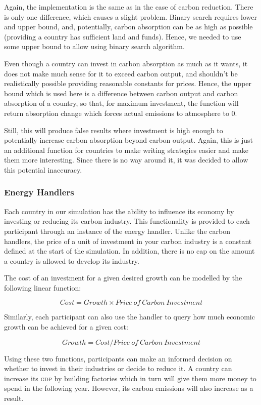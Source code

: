 Again, the implementation is the same as in the case of carbon reduction. There is only one difference, which causes a slight problem. Binary search requires lower and upper bound, and, potentially, carbon absorption can be as high as possible (providing a country has sufficient land and funds). Hence, we needed to use some upper bound to allow using binary search algorithm.

Even though a country can invest in carbon absorption as much as it wants, it does not make much sense for it to exceed carbon output, and shouldn't be realistically possible providing reasonable constants for prices. Hence, the upper bound which is used here is a difference between carbon output and carbon absorption of a country, so that, for maximum investment, the function will return absorption change which forces actual emissions to atmosphere to 0.

Still, this will produce false results where investment is high enough to potentially increase carbon absorption beyond carbon output. Again, this is just an additional function for countries to make writing strategies easier and make them more interesting. Since there is no way around it, it was decided to allow this potential inaccuracy.

\subsubsection{Energy Handlers}

Each country in our simulation has the ability to influence its economy by investing or reducing its carbon industry. This functionality is provided to each participant through an instance of the energy handler. Unlike the carbon handlers, the price of a unit of investment in your carbon industry is a constant defined at the start of the simulation. In addition, there is no cap on the amount a country is allowed to develop its industry. 

The cost of an investment for a given desired growth can be modelled by the following linear function:

$$
Cost = Growth \times Price~of~Carbon~Investment
$$

Similarly, each participant can also use the handler to query how much economic growth can be achieved for a given cost:

$$
Growth = Cost / Price~of~Carbon~Investment
$$

Using these two functions, participants can make an informed decision on whether to invest in their industries or decide to reduce it. A country can increase its \textsc{gdp} by building factories which in turn will give them more money to spend in the following year. However, its carbon emissions will also increase as a result.

